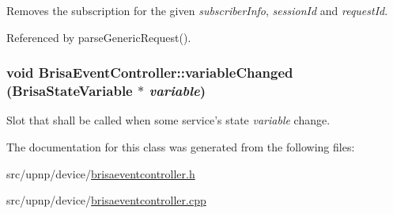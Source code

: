 Removes the subscription for the given {\itshape subscriberInfo\/}, {\itshape sessionId\/} and {\itshape requestId\/}. 

Referenced by parseGenericRequest().\hypertarget{classBrisaUpnp_1_1BrisaEventController_a59db4e5d9646da37a2983840dad09485}{
\subsubsection[{variableChanged}]{\setlength{\rightskip}{0pt plus 5cm}void BrisaEventController::variableChanged ({\bf BrisaStateVariable} $\ast$ {\em variable})}}
\label{classBrisaUpnp_1_1BrisaEventController_a59db4e5d9646da37a2983840dad09485}


Slot that shall be called when some service's state {\itshape variable\/} change. 

The documentation for this class was generated from the following files:\begin{DoxyCompactItemize}
\item 
src/upnp/device/\hyperlink{brisaeventcontroller_8h}{brisaeventcontroller.h}\item 
src/upnp/device/\hyperlink{brisaeventcontroller_8cpp}{brisaeventcontroller.cpp}\end{DoxyCompactItemize}
